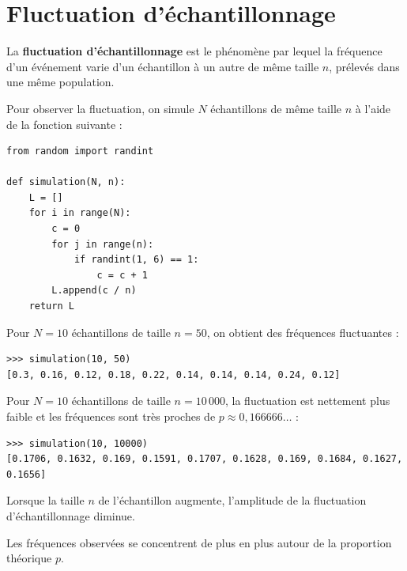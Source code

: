 \section{Fluctuation d'échantillonnage}

\begin{defin}
	La \textbf{fluctuation d'échantillonnage} est le phénomène par lequel la fréquence d'un événement varie d'un échantillon à un autre de même taille $n$, prélevés dans une même population.
\end{defin}

\begin{ex}
	Pour observer la fluctuation, on simule $N$ échantillons de même taille $n$ à l'aide de la fonction suivante :

	\begin{lstlisting}
from random import randint

def simulation(N, n):
    L = []
    for i in range(N):
        c = 0
        for j in range(n):
            if randint(1, 6) == 1:
                c = c + 1
        L.append(c / n)
    return L
\end{lstlisting}

	Pour $N = 10$ échantillons de taille $n = 50$, on obtient des fréquences fluctuantes :
	\begin{lstlisting}
>>> simulation(10, 50)
[0.3, 0.16, 0.12, 0.18, 0.22, 0.14, 0.14, 0.14, 0.24, 0.12]
\end{lstlisting}

	Pour $N = 10$ échantillons de taille $n = 10\,000$, la fluctuation est nettement plus faible et les fréquences sont très proches de $p \approx 0{,}166666\ldots$ :
	\begin{lstlisting}
>>> simulation(10, 10000)
[0.1706, 0.1632, 0.169, 0.1591, 0.1707, 0.1628, 0.169, 0.1684, 0.1627, 0.1656]
\end{lstlisting}
\end{ex}

\newpage

\begin{prop}
	Lorsque la taille $n$ de l'échantillon augmente, l'amplitude de la fluctuation d'échantillonnage diminue.

	Les fréquences observées se concentrent de plus en plus autour de la proportion théorique $p$.
\end{prop}

